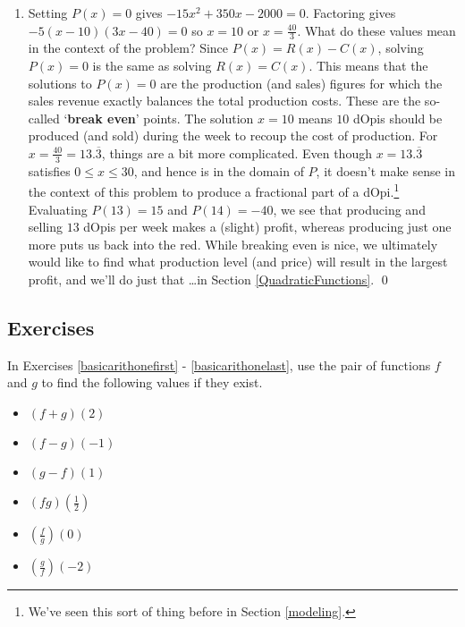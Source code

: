 \begin{ex}
\begin{enumerate}
\item Setting $P(x) = 0$ gives $-15x^2+350x-2000 = 0$.  Factoring gives $-5(x-10)(3x-40) = 0$ so $x = 10$ or $x = \frac{40}{3}$.  What do these values mean in the context of the problem?  Since $P(x) = R(x) - C(x)$, solving $P(x) = 0$ is the same as solving $R(x) = C(x)$. This means that the solutions to $P(x) = 0$ are the production (and sales) figures for which the sales revenue exactly balances the total production costs.  These are the so-called `\textbf{break even}' points.  The solution $x=10$ means $10$ dOpis should be produced (and sold) during the week to recoup the cost of production. For $x = \frac{40}{3} = 13.\overline{3}$, things are a bit more complicated.  Even though $x = 13.\overline{3}$ satisfies $0 \leq x \leq 30$, and hence is in the domain of $P$, it doesn't make sense in the context of this problem to produce a fractional part of a dOpi.\footnote{We've seen this sort of thing before in Section \ref{modeling}.}  Evaluating $P(13) = 15$ and $P(14) = -40$, we see that producing and selling $13$ dOpis per week makes a (slight) profit, whereas producing just one more puts us back into the red. While breaking even is nice, we ultimately would like to find what production level (and price) will result in the largest profit, and we'll do just that \ldots in Section \ref{QuadraticFunctions}. \qed


\end{enumerate}

\end{ex}


\newpage

\subsection{Exercises}

In Exercises \ref{basicarithonefirst} - \ref{basicarithonelast}, use the pair of functions $f$ and $g$ to find the following values if they exist.

\begin{multicols}{3}
\begin{itemize}

\item  $(f+g)(2)$ 
\item  $(f-g)(-1)$
\item  $(g-f)(1)$

\end{itemize}
\end{multicols}

\begin{multicols}{3}
\begin{itemize}

\item  $(fg)\left(\frac{1}{2}\right)$
\item  $\left(\frac{f}{g}\right)(0)$
\item  $\left(\frac{g}{f}\right)\left(-2\right)$

\end{itemize}
\end{multicols}

